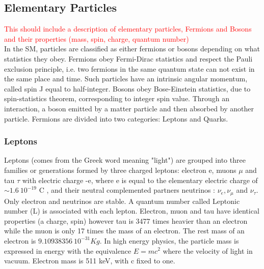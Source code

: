 \subsection{Elementary Particles}
\label{chap1:SM:EP}
\textcolor{red}{
This should include a description of elementary particles, Fermions and  Bosons and their properties (mass, spin, charge, quantum number)
\\ }
In the SM, particles are classified as either fermions or bosons depending on what statistics they obey. Fermions obey Fermi-Dirac statistics and respect the Pauli exclusion principle, i.e. two fermions in the same quantum state can not exist in the same place and time. Such particles have an intrinsic angular momentum, called spin J equal to half-integer. Bosons obey Bose-Einstein statistics, due to spin-statistics theorem, corresponding to integer spin value. Through an interaction, a boson emitted by a matter particle and then absorbed by another particle. Fermions are divided into two categories: Leptons and Quarks.
\subsubsection{Leptons}
Leptons (comes from the Greek word meaning "light") are grouped into three families or generations formed by three charged leptons: electron e, muons $\mu$ and tau $\tau$ with electric charge -e, where e is equal to the elementary electric charge of $\sim 1.6 \ 10^{-19} $ C \cite{PDG}, and their neutral complemented partners neutrinos : $\nu_{e}, \nu_{\mu}$ and $\nu_{\tau}$. Only electron and neutrinos are stable. A quantum number called Leptonic number (L) is associated with each lepton. Electron, muon and tau have identical properties (a charge, spin) however tau is 3477 times heavier than an electron while the muon is only 17 times the mass of an electron. The rest mass of an electron is $9.10938356 \ 10^{-31} Kg$. In high energy physics, the particle mass is expressed in energy with the equivalence $E=mc^2$ where the velocity of light in vacuum. Electron mass is 511 keV, with c fixed to one.
